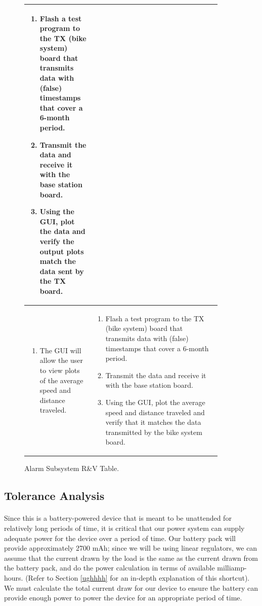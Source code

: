 \documentclass{article}
\begin{document}
\begin{figure}[H]
\begin{center}
\begin{tabular}{|p{0.3 \linewidth}|p{0.6 \linewidth}|}
\begin{enumerate}
				\item Flash a test program to the TX (bike system) board that transmits data with (false) timestamps that cover a 6-month period. 
				\item Transmit the data and receive it with the base station board. 
				\item Using the GUI, plot the data and verify the output plots match the data sent by the TX board. 
			\end{enumerate} \\
			\hline
			\begin{enumerate}
				\item The GUI will allow the user to view plots of the average speed and distance traveled.
			\end{enumerate}  & \begin{enumerate}
				\item Flash a test program to the TX (bike system) board that transmits data with (false) timestamps that cover a 6-month period. 
				\item Transmit the data and receive it with the base station board. 
				\item Using the GUI, plot the average speed and distance traveled and verify that it matches the data transmitted by the bike system board. 
			\end{enumerate} \\
			\hline

		\end{tabular}
	\end{center}
	\caption{Alarm Subsystem R\&V Table.}
\end{figure}


\subsection{Tolerance Analysis}\label{tol}

\paragraph{} 
Since this is a battery-powered device that is meant to be unattended for relatively long periods of time, it is critical that our power system can supply adequate power for the device over a period of time. Our battery pack will provide approximately 2700 mAh; since we will be using linear regulators, we can assume that the current drawn by the load is the same as the current drawn from the battery pack, and do the power calculation in terms of available milliamp-hours. (Refer to Section \ref{ughhhh} for an in-depth explanation of this shortcut). We must calculate the total current draw for our device to ensure the battery can provide enough power to power the device for an appropriate period of time. 
\end{document}
